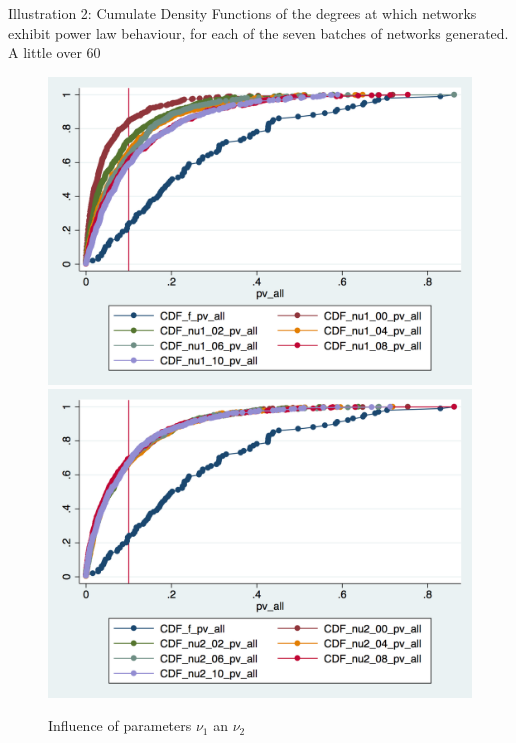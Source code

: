 Illustration 2: Cumulate Density Functions of the degrees at which networks exhibit power law behaviour, for each of the seven batches of networks generated. A little over 60%

\begin{figure}[thb]
\centering

	\includegraphics[width=.9\linewidth]{../Pictures/CDF_nu1.png}\label{fig:CDFnu1}
	\includegraphics[width=.9\linewidth]{../Pictures/CDF_nu2.png}\label{fig:CDFnu2}
  \caption{Influence of parameters $\nu_1$ an $\nu_2$}
 \label{fig:CDF}
\end{figure}


